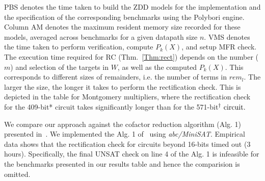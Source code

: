PBS denotes the time taken to build the ZDD models for the implementation
and the specification of the corresponding 
benchmarks using the Polybori engine. Column AM denotes the maximum
resident memory size recorded for these models,  
averaged across benchmarks for a given datapath size $n$.
VMS denotes the time
taken to perform verification, compute $P_k(X)$, and setup MFR check.
The execution time required for RC (Thm.~\ref{Thm:rect}) depends 
on the number ($m$) and selection of the targets in $W$, as well as the
computed $P_k(X)$. This corresponds 
to different sizes of remainders, i.e. the number of terms in $rem_l$. The larger the size, 
the longer it takes to perform the rectification check. This is depicted in the table for 
Montgomery multipliers, where the rectification check for the 409-bit* circuit takes 
significantly longer than for the 571-bit$\td~\text{circuit}.$ 


We compare our approach against the cofactor reduction algorithm (Alg. 1) 
presented in~\cite{MF_Huang:DATE12}. We implemented the Alg. 1 of~\cite{MF_Huang:DATE12} 
using {\it abc/MiniSAT}. Empirical data shows that the rectification check for 
circuits beyond 16-bits timed out (3 hours). Specifically, the final UNSAT 
check on line 4 of the Alg. 1 is infeasible for the benchmarks
presented in our results table and hence the comparision is omitted.   

